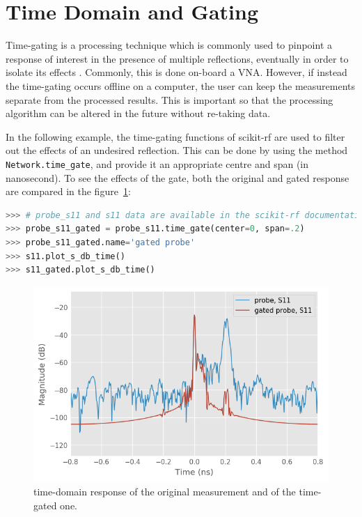 \documentclass{IEEEjmw}
\begin{document}
\section{Time Domain and Gating}
Time-gating is a processing technique which is commonly used to pinpoint a response of interest in the presence of multiple reflections, eventually in order to isolate its effects \cite{cronson1973, bennett1978}. Commonly, this is done on-board a VNA. However, if instead the time-gating occurs offline on a computer, the user can keep the measurements separate from the processed results. This is important so that the processing algorithm can be altered in the future without re-taking data. 

In the following example, the time-gating functions of scikit-rf are used to filter out the effects of an undesired reflection. This can be done by using the method \texttt{Network.time\_gate}, and provide it an appropriate centre and span (in nanosecond). To see the effects of the gate, both the original and gated response are compared in the figure~\ref{fig:gated1}:

\begin{lstlisting}[language=Python]
>>> # probe_s11 and s11 data are available in the scikit-rf documentation
>>> probe_s11_gated = probe_s11.time_gate(center=0, span=.2)
>>> probe_s11_gated.name='gated probe'
>>> s11.plot_s_db_time()
>>> s11_gated.plot_s_db_time()
\end{lstlisting}

\begin{figure}
	\centering
	\includegraphics[width=0.95\linewidth]{figures/time_domain1}
	\caption{time-domain response of the original measurement and of the time-gated one.}
	\label{fig:gated1}
\end{figure}
\end{document}
